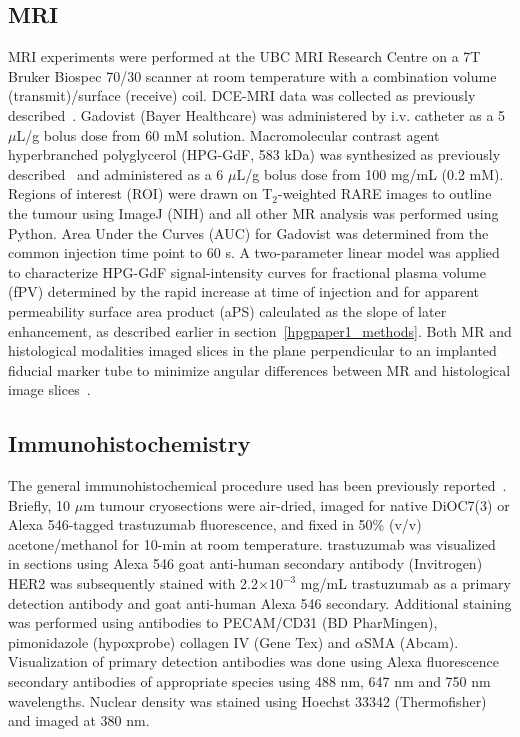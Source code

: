 \subsection{MRI}
MRI experiments were performed at the UBC MRI Research Centre on a 7T Bruker Biospec 70/30 scanner at room temperature with a combination volume (transmit)/surface (receive) coil.
\acs{DCE-MRI} data was collected as previously described~\cite{Baker:2015cob}.
Gadovist (Bayer Healthcare) was administered by \acs{i.v.} catheter as a 5 $\mu$L/g bolus dose from 60 mM solution.
Macromolecular contrast agent hyperbranched polyglycerol (\acs{HPG-GdF}, 583 kDa) was synthesized as previously described~\cite{Kainthan:2006ce,Saatchi:2012hc} and administered as a 6 $\mu$L/g bolus dose from 100 mg/mL (0.2 mM).
Regions of interest (ROI) were drawn on T$_2$-weighted \acs{RARE} images to outline the tumour using ImageJ (NIH) and all other MR analysis was performed using Python.
Area Under the Curves (AUC) for Gadovist was determined from the common injection time point to 60 s.
A two-parameter linear model was applied to characterize \acs{HPG-GdF} signal-intensity curves for fractional plasma volume (fPV) determined by the rapid increase at time of injection and for apparent permeability surface area product (aPS) calculated as the slope of later enhancement, as described earlier in section~\ref{hpgpaper1_methods}.
Both MR and histological modalities imaged slices in the plane perpendicular to an implanted fiducial marker tube to minimize angular differences between MR and histological image slices~\cite{Bains:2009hh}.

\subsection{Immunohistochemistry}
The general immunohistochemical procedure used has been previously reported~\cite{Baker:2008ci}.
Briefly, 10 $\mu$m tumour cryosections were air-dried, imaged for native DiOC7(3) or Alexa 546-tagged trastuzumab fluorescence, and fixed in 50\% (v/v) acetone/methanol for 10-min at room temperature.
trastuzumab was visualized in sections using Alexa 546 goat anti-human secondary antibody (Invitrogen)
\acs{HER2} was subsequently stained with 2.2$\times 10^{-3}$ mg/mL trastuzumab as a primary detection antibody and goat anti-human Alexa 546 secondary.
Additional staining was performed using antibodies to PECAM/CD31 (BD PharMingen), pimonidazole (hypoxprobe) collagen IV (Gene Tex) and $\alpha$SMA (Abcam).
Visualization of primary detection antibodies was done using Alexa fluorescence secondary antibodies of appropriate species using 488 nm, 647 nm and 750 nm wavelengths.
Nuclear density was stained using Hoechst 33342 (Thermofisher) and imaged at 380 nm.

